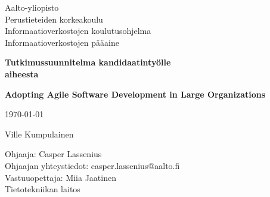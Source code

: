 \begin{titlepage}

	\begin{flushleft}
	\begin{minipage}{15cm}
		\linespread{1.0}\small
		Aalto-yliopisto \\
		Perustieteiden korkeakoulu \\
		Informaatioverkostojen koulutusohjelma \\
		Informaatioverkostojen pääaine
		\par
	\end{minipage}
	\end{flushleft}
	\centering
	\vspace{1.5cm}
	{\large\bfseries Tutkimussuunnitelma kandidaatintyölle \\ aiheesta \par}
	{\LARGE\bfseries Adopting Agile Software Development in Large
	Organizations\par}
	\vspace{1.5cm}
	{\large \today\par}
	{\Large Ville Kumpulainen \par}
	\vfill

	\begin{flushleft}
	\begin{minipage}{15cm}
		\linespread{1.0}\small
		Ohjaaja: Casper Lassenius \\
		Ohjaajan yhteystiedot: casper.lassenius@aalto.fi \\
		Vastuuopettaja: Miia Jaatinen \\
		Tietotekniikan laitos
		\par
	\end{minipage}
	\end{flushleft}


\end{titlepage}
